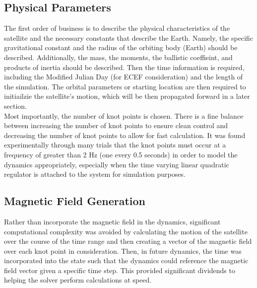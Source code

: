 \documentclass[10pt,notitlepage,twocolumn]{article}
\begin{document}
\subsection{Physical Parameters}
The first order of business is to describe the physical characteristics of the satellite and the necessary constants that describe the Earth. Namely, the specific gravitational constant and the radius of the orbiting body (Earth) should be described. Additionally, the mass, the moments, the ballistic coeffieint, and products of inertia should be described. Then the time information is required, including the Modified Julian Day (for ECEF consideration) and the length of the simulation. The orbital parameters or starting location are then required to initiailzie the satellite's motion, which will be then propagated forward in a later section. \\

Most importantly, the number of knot points is chosen. There is a fine balance between increasing the number of knot points to ensure clean control and decreasing the number of knot points to allow for fast calculation. It was found experimentally through many trials that the knot points must occur at a frequency of greater than 2 Hz (one every 0.5 seconds) in order to model the dynamics appropriately, especially when the time varying linear quadratic regulator is attached to the system for simulation purposes. 

\subsection{Magnetic Field Generation}
Rather than incorporate the magnetic field in the dynamics, significant computational complexity was avoided by calculating the motion of the satellite over the course of the time range and then creating a vector of the magnetic field over each knot point in consideration. Then, in future dynamics, the time was incorporated into the state such that the dynamics could reference the magnetic field vector given a specific time step. This provided significant dividends to helping the solver perform calculations at speed.\\
\end{document}
